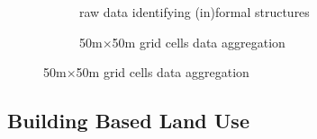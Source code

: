 \documentclass[12pt]{article}
\begin{document}
\begin{figure}[t!]
        \centering
        \caption[ Building-Based Land Use Data ]
        {\small Building-Based Land Use Data } 
        \vspace{2mm}
        \begin{subfigure}[b]{0.48\textwidth}
            \centering
            \caption[Network2]%
            {{\small raw data identifying (in)formal structures}}    
        \end{subfigure}
        \hfill\quad
        \begin{subfigure}[b]{0.48\textwidth}  
            \centering 
            \caption[]%
            {{\small 50m$\times$50m grid cells data aggregation}}    
        \end{subfigure}
        \label{fig:bblumaps}
    \end{figure} 

\subsection{Building Based Land Use}
\label{section:data:bblu}
\end{document}
